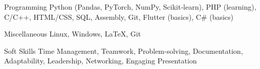 
\begin{cvskills}

  \cvskill
    {Programming} %
    {Python (Pandas, PyTorch, NumPy, Scikit‑learn), PHP (learning), 
     C/C++, HTML/CSS, SQL, Assembly, Git, Flutter (basics), 
     C\# (basics)} %

  \cvskill
    {Miscellaneous} %
    {Linux, Windows, \LaTeX, Git} %

  \cvskill
    {Soft Skills} %
    {Time Management, Teamwork, Problem-solving, Documentation, 
     Adaptability, Leadership, Networking, Engaging Presentation} %

\end{cvskills}
